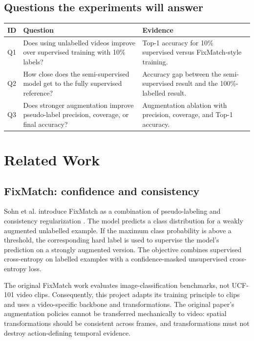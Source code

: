 \documentclass[11pt,a4paper]{article}
\begin{document}
\subsection{Questions the experiments will answer}
\begin{tabularx}{\textwidth}{L{1.1cm}Y Y}
\toprule
\textbf{ID} & \textbf{Question} & \textbf{Evidence} \\
\midrule
Q1 & Does using unlabelled videos improve over supervised training with 10\% labels? & Top-1 accuracy for 10\% supervised versus FixMatch-style training. \\
Q2 & How close does the semi-supervised model get to the fully supervised reference? & Accuracy gap between the semi-supervised result and the 100\%-labelled result. \\
Q3 & Does stronger augmentation improve pseudo-label precision, coverage, or final accuracy? & Augmentation ablation with precision, coverage, and Top-1 accuracy. \\
\bottomrule
\end{tabularx}

\section{Related Work}
\subsection{FixMatch: confidence and consistency}
Sohn et al. introduce FixMatch as a combination of pseudo-labeling and consistency regularization \cite{fixmatch}. The model predicts a class distribution for a weakly augmented unlabelled example. If the maximum class probability is above a threshold, the corresponding hard label is used to supervise the model's prediction on a strongly augmented version. The objective combines supervised cross-entropy on labelled examples with a confidence-masked unsupervised cross-entropy loss.

The original FixMatch work evaluates image-classification benchmarks, not UCF-101 video clips. Consequently, this project adapts its training principle to clips and uses a video-specific backbone and transformations. The original paper's augmentation policies cannot be transferred mechanically to video: spatial transformations should be consistent across frames, and transformations must not destroy action-defining temporal evidence.
\end{document}
